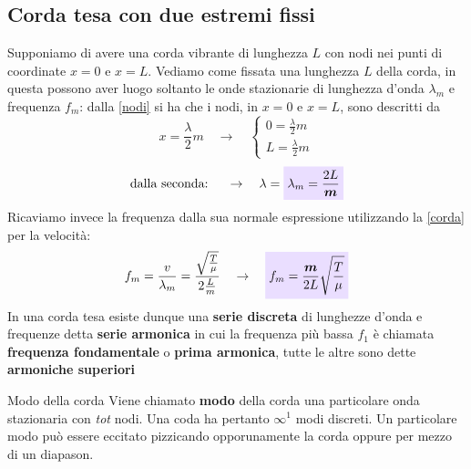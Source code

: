\documentclass[x11names]{article}
\newcommand{\viola}[1]{\colorbox{yred}{$\displaystyle #1$}}
\begin{document}
		\subsection{Corda tesa con due estremi fissi}
		Supponiamo di avere una corda vibrante di lunghezza \(L\) con nodi nei punti di coordinate \(x=0\) e \(x=L\). Vediamo come fissata una lunghezza \(L\) della corda, in questa possono aver luogo soltanto le onde stazionarie di lunghezza d'onda \(\lambda_m\) e frequenza \(f_m\): dalla \ref{nodi} si ha che i nodi, in \(x=0\) e \(x=L\), sono descritti da
		\[ 
		x = \frac{\lambda}{2}m \quad \rightarrow \quad \begin{cases}
			0 = \frac{\lambda}{2}m\\ L = \frac{\lambda}{2}m
		\end{cases}
		\]
		\begin{equation}\label{lambdam}
			\text{dalla seconda: }\quad \to \quad \lambda = \viola{\lambda_m = \frac{2L}{\boldsymbol{m}}}
		\end{equation}
		Ricaviamo invece la frequenza dalla sua normale espressione utilizzando la \ref{corda} per la velocità:
		\[ 
		f_m = \frac{v}{\lambda_m} = \frac{\sqrt{\frac{T}{\mu}}}{2\frac{L}{m}} \quad \rightarrow \quad  \viola{f_m = \frac{\boldsymbol{m}}{2L}\sqrt{\frac{T}{\mu}}}
		\]
		In una corda tesa esiste dunque una \textbf{serie discreta} di lunghezze d'onda e frequenze detta \textbf{serie armonica} in  cui  la frequenza più bassa  \(f_1\) è chiamata \textbf{frequenza fondamentale} o \textbf{prima armonica}, tutte le altre sono dette \textbf{armoniche superiori}
		
		\begin{center}
			\colorbox{yblue}{\begin{minipage}{5.75in}
					\begin{blues}{Modo della corda}
						Viene chiamato \textbf{modo} della corda una particolare onda stazionaria con \textit{tot} nodi. Una coda ha pertanto \(\infty^1\) modi discreti. Un particolare modo può essere eccitato pizzicando opporunamente la corda oppure per mezzo di un diapason.
					\end{blues}
			\end{minipage}}
		\end{center}
		
\end{document}

